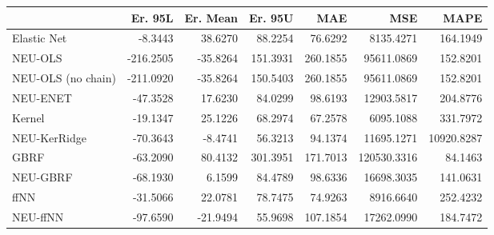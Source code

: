 \begin{tabular}{lrrrrrr}
\toprule
{} &   Er. 95L &  Er. Mean &  Er. 95U &      MAE &         MSE &       MAPE \\
\midrule
Elastic Net        &   -8.3443 &   38.6270 &  88.2254 &  76.6292 &   8135.4271 &   164.1949 \\
NEU-OLS            & -216.2505 &  -35.8264 & 151.3931 & 260.1855 &  95611.0869 &   152.8201 \\
NEU-OLS (no chain) & -211.0920 &  -35.8264 & 150.5403 & 260.1855 &  95611.0869 &   152.8201 \\
NEU-ENET           &  -47.3528 &   17.6230 &  84.0299 &  98.6193 &  12903.5817 &   204.8776 \\
Kernel             &  -19.1347 &   25.1226 &  68.2974 &  67.2578 &   6095.1088 &   331.7972 \\
NEU-KerRidge       &  -70.3643 &   -8.4741 &  56.3213 &  94.1374 &  11695.1271 & 10920.8287 \\
GBRF               &  -63.2090 &   80.4132 & 301.3951 & 171.7013 & 120530.3316 &    84.1463 \\
NEU-GBRF           &  -68.1930 &    6.1599 &  84.4789 &  98.6336 &  16698.3035 &   141.0631 \\
ffNN               &  -31.5066 &   22.0781 &  78.7475 &  74.9263 &   8916.6640 &   252.4232 \\
NEU-ffNN           &  -97.6590 &  -21.9494 &  55.9698 & 107.1854 &  17262.0990 &   184.7472 \\
\bottomrule
\end{tabular}
